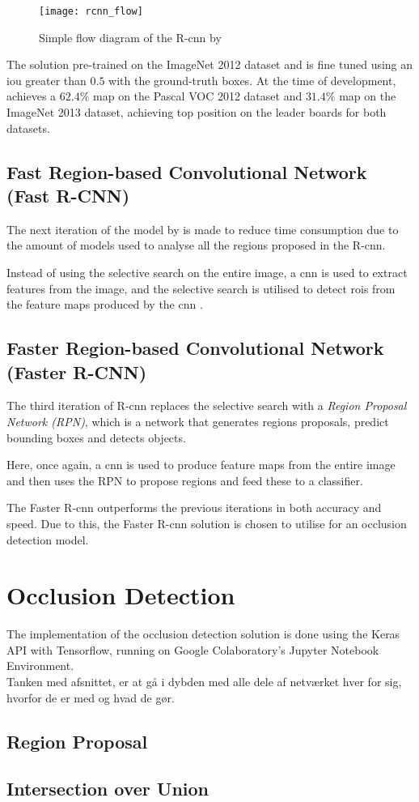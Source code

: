 \begin{figure}[H]
	\centering
	\texttt{[image: rcnn\_flow]}
	\caption{Simple flow diagram of the R-\gls{cnn} by \cite{Girshick2014}}
	\label{fig:rcnn_flow}
\end{figure}

The solution pre-trained on the ImageNet 2012 dataset and is fine tuned using an \gls{iou} greater than $0.5$ with the ground-truth boxes. At the time of development, \cite{Girshick2014} achieves a $62.4\%$ \gls{map} on the Pascal VOC 2012 dataset and $31.4\%$ \gls{map} on the ImageNet 2013 dataset, achieving top position on the leader boards for both datasets.

\subsection{Fast Region-based Convolutional Network (Fast R-CNN)}
The next iteration of the model by \cite{Girshick2015} is made to reduce time consumption due to the amount of models used to analyse all the regions proposed in the R-\gls{cnn}.

Instead of using the selective search on the entire image, a \gls{cnn} is used to extract features from the image, and the selective search is utilised to detect \gls{roi}s from the feature maps produced by the \gls{cnn} \citep{Girshick2015}.

\subsection{Faster Region-based Convolutional Network (Faster R-CNN)}
The third iteration of R-\gls{cnn} replaces the selective search with a \textit{Region Proposal Network (RPN)}, which is a network that generates regions proposals, predict bounding boxes and detects objects.

Here, once again, a \gls{cnn} is used to produce feature maps from the entire image and then uses the RPN to propose regions and feed these to a classifier.

The Faster R-\gls{cnn} outperforms the previous iterations in both accuracy and speed. Due to this, the Faster R-\gls{cnn} solution is chosen to utilise for an occlusion detection model.

\section{Occlusion Detection}
The implementation of the occlusion detection solution is done using the Keras API with Tensorflow, running on Google Colaboratory's Jupyter Notebook Environment.\\

Tanken med afsnittet, er at gå i dybden med alle dele af netværket hver for sig, hvorfor de er med og hvad de gør.

\subsection{Region Proposal}

\subsection{Intersection over Union}
